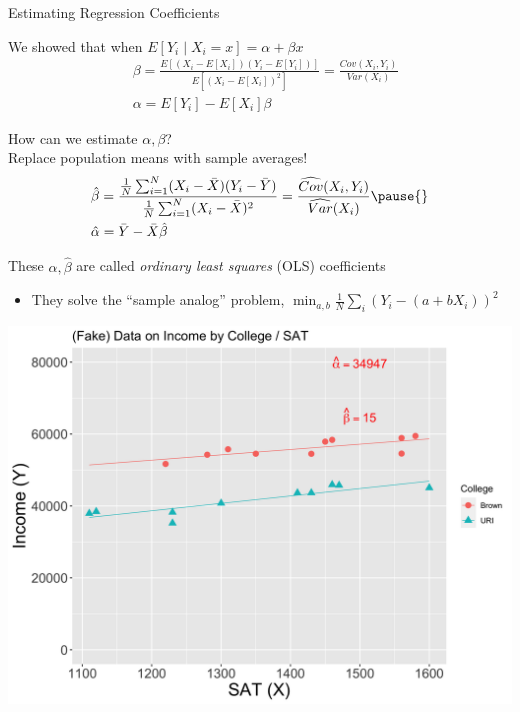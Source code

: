 \documentclass[11pt,english,handout]{beamer}
\newenvironment{wideitemize}{\itemize\addtolength{\itemsep}{10pt}}{\enditemize}
\begin{document}
\begin{frame}{Estimating Regression Coefficients}
	\begin{wideitemize}
	\item
	We showed that  when $E[Y_i\mid X_i=x]=\alpha+\beta x$
\begin{align*}
& \beta = \frac{E[ (X_i -E[X_i]) (Y_i - E[Y_i])  ]}{E[ (X_i - E[X_i])^2 ]} = \frac{Cov(X_i, Y_i)}{Var(X_i)} \\ 
& \alpha = E[Y_i] - E[X_i] \beta
\end{align*}
	
	\item
	How can we estimate $\alpha,\beta$? \pause \\ Replace population means with sample averages!
	\pause
	\begin{align*}
		& \hat\beta = \dfrac{ \frac{1}{N} \sum_{i=1}^{N} (X_i - \bar{X})(Y_i - \bar{Y})  }{ \frac{1}{N} \sum_{i=1}^N (X_i - \bar{X})^2 } =\frac{\widehat{Cov}(X_i,Y_i)}{\widehat{Var}(X_i)}\pause{} \\
		& \hat\alpha = \bar{Y} - \bar{X} \hat{\beta}
	\end{align*}

	
	\pause
	\item
	These $\hat\alpha,\hat\beta$ are called \textit{ordinary least squares} (OLS) coefficients\smallskip
\begin{itemize}
\item They solve the ``sample analog'' problem, $\min_{a,b}\frac{1}{N}\sum_i (Y_i -  (a+ b X_i)  )^2   $
\end{itemize}
	\end{wideitemize}	
\end{frame}


\begin{frame}
	\centering
\includegraphics[width = .9\linewidth]{fake-sat-with-trend-brown-betas.png}
\end{frame}
\end{document}
